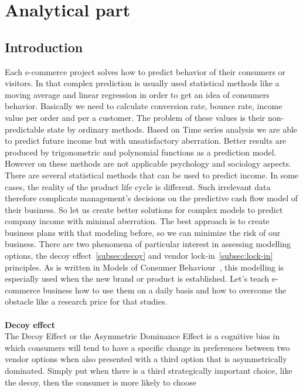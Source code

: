 
\chapter{Analytical part} \label{sec:analytical}

\section{Introduction} \label{sec:description}
Each e-commerce project solves how to predict behavior of their consumers or visitors.
In that complex prediction is usually used statistical methods like a moving average and linear regression in order to
get an idea of consumers behavior.
Basically we need to calculate conversion rate, bounce rate, income value per order and per a customer.
The problem of these values is their non-predictable state by ordinary methods.
Based on Time series analysis we are able to predict
future income but with unsatisfactory aberration.
Better results are produced by trigonometric and polynomial functions as a prediction model.
However on these methods are not applicable psychology and sociology aspects.
There are several statistical methods that can be used to predict income.
In some cases, the reality of the product life cycle is different.
Such irrelevant data therefore complicate management's decisions on the predictive cash flow model of their business.
So let us create better solutions for complex models to predict company income with minimal aberration.
The best approach is to create business plans with that modeling before, so we can minimize the risk of our business.
There are  two phenomena of particular interest in assessing modelling options,  the decoy effect~\ref{subsec:decoy} and vendor lock-in~\ref{subsec:lock-in} principles.
As is written in Models of Consumer Behaviour~\cite{patel}, this modelling is especially used when the new brand or product is established.
Let's teach e-commerce business how to use them on a daily basis and how to overcome the obstacle like a research price for that studies.\\
\\
\textbf{Decoy effect} \label{subsec:decoy}\\
The Decoy Effect or the Asymmetric Dominance Effect is a cognitive bias in which consumers will tend to have a specific
change in preferences between two vendor options when also presented with a third option that is asymmetrically dominated.
Simply put when there is a third strategically important choice, like the decoy, then the consumer is more likely to choose
